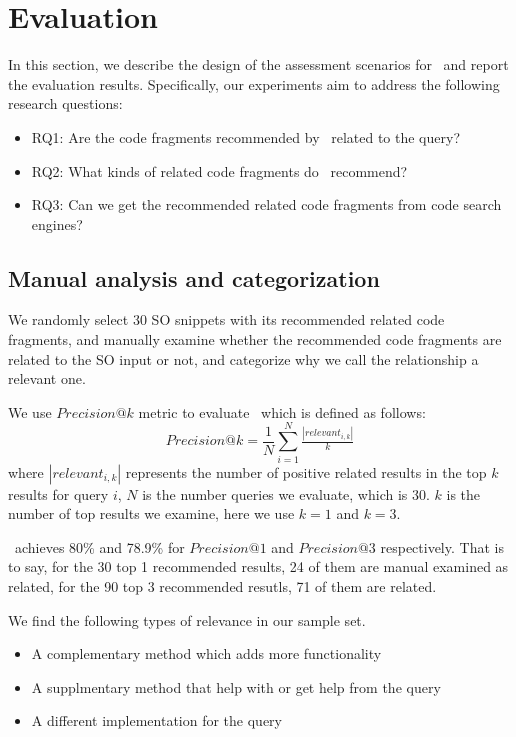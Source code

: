 \section{Evaluation}
\label{sec:Evaluation}
In this section, we describe the design of the assessment scenarios for \tool\ and report the evaluation results. Specifically, our experiments aim to address the following research questions:
\begin{itemize}
	\item RQ1: Are the code fragments recommended by \tool\ related to the query?
	\item RQ2: What kinds of related code fragments do \tool\ recommend?
	\item RQ3: Can we get the recommended related code fragments from code search engines?
\end{itemize}

\subsection{Manual analysis and categorization}
We randomly select 30 SO snippets with its recommended related code fragments, and manually examine whether the recommended code fragments are related to the SO input or not, and categorize why we call the relationship a relevant one.

We use $Precision@k$ metric to evaluate \tool\  which is defined as follows:
\begin{equation}
Precision@k = \frac{1}{N}\sum_{i=1}^{N}\tfrac{\left | relevant_{i,k} \right |}{k}
\end{equation}
where $\left | relevant_{i,k} \right |$ represents the number of positive related results in the top $k$ results for query $i$, $N$ is the number queries we evaluate, which is $30$. $k$ is the number of top results we examine, here we use $k=1$ and $k=3$.

\tool\ achieves 80\% and 78.9\% for $Precision@1$ and $Precision@3$ respectively. That is to say, for the 30 top 1 recommended results, 24 of them are manual examined as related, for the 90 top 3 recommended resutls, 71 of them are related.

We find the following types of relevance in our sample set.
\begin{itemize}
	\item A complementary method which adds more functionality
	\item A supplmentary method that help with or get help from the query 
	\item A different implementation for the query	
\end{itemize}

